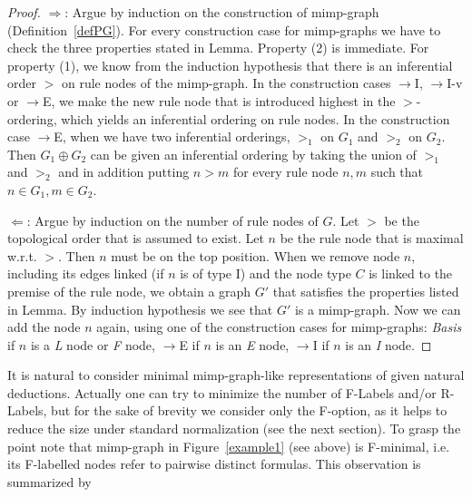 \documentclass[submission,copyright,creativecommons]{eptcs}
\begin{document}
\begin{proof}

$\Rightarrow$: Argue by induction on the construction of mimp-graph (Definition~\ref{defPG}). 
For every construction case for mimp-graphs we have to check the three properties 
stated in Lemma. Property (2) is immediate. For property (1), we know 
from the induction hypothesis that there is an inferential order $>$ on rule 
nodes of the mimp-graph. In the construction cases $\to$I, $\to$I-v or $\to$E, we make the new rule node that is introduced highest in the $>$-ordering, which yields an 
inferential ordering on rule nodes. 
In the construction case $\to$E, when we have two inferential 
orderings, $>_1$ on $G_1$ and $>_2$ on $G_2$. Then $G_1 \oplus G_2$ 
can be given an inferential ordering by taking the union of $>_1$ and $>_2$ 
and in addition putting $n > m$ for every rule node $n, m$ such that  
$n \in G_1, m \in G_2$.

$\Leftarrow$: Argue by induction on the number of rule nodes of $G$. 
Let $>$ be the topological order that is assumed to exist. Let $n$ 
be the rule node that is maximal w.r.t. $>$. Then $n$ must be on 
the top position. When we remove node $n$, including its edges 
linked (if $n$ is of type I) and the node type $C$  is linked to 
the premise of the rule node, we obtain a graph $G'$ that satisfies 
the properties listed in Lemma. By induction hypothesis we see 
that $G'$ is a mimp-graph. Now we can add the node $n$ again, using one of 
the construction cases for mimp-graphs: {\em Basis} if $n$ is a 
{\em L} node or {\em F} node, $\to$E if $n$ is an {\em E} node, $\to$I if $n$ is an {\em I} node.
\end{proof}

It is natural to consider minimal mimp-graph-like representations of given
natural deductions. Actually one can try to minimize the number of F-Labels
and/or R-Labels, but for the sake of brevity we consider only the F-option,
as it helps to reduce the size under standard normalization (see the next
section). To grasp the point note that mimp-graph in Figure~\ref{example1}
(see above) is F-minimal, i.e. its F-labelled nodes refer to pairwise
distinct formulas. This observation is summarized by
\end{document}

